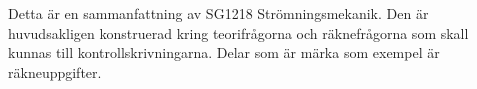 Detta är en sammanfattning av SG1218 Strömningsmekanik. Den är huvudsakligen konstruerad kring teorifrågorna och räknefrågorna som skall kunnas till kontrollskrivningarna. Delar som är märka som exempel är räkneuppgifter.